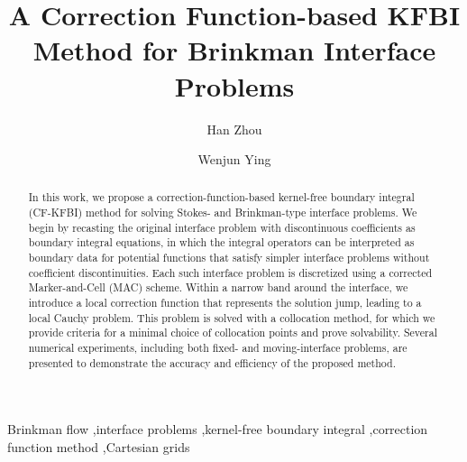 \documentclass[preprint,11pt]{elsarticle}
\theoremstyle{remark}
\begin{document}

\begin{frontmatter}

\title{A Correction Function-based KFBI Method for Brinkman Interface Problems}

\author[upenn]{Han Zhou}

\author[sjtu]{Wenjun Ying}


\address[upenn]{Department of Mathematics, University of Pennsylvania, Philadelphia, PA 19104, USA}
\address[sjtu]{School of Mathematical Sciences, MOE-LSC and Institute of Natural Sciences, Shanghai Jiao Tong University, Minhang, Shanghai 200240, China}

\begin{abstract}
In this work, we propose a correction-function-based kernel-free boundary integral (CF-KFBI) method for solving Stokes- and Brinkman-type interface problems. We begin by recasting the original interface problem with discontinuous coefficients as boundary integral equations, in which the integral operators can be interpreted as boundary data for potential functions that satisfy simpler interface problems without coefficient discontinuities. Each such interface problem is discretized using a corrected Marker-and-Cell (MAC) scheme. Within a narrow band around the interface, we introduce a local correction function that represents the solution jump, leading to a local Cauchy problem. This problem is solved with a collocation method, for which we provide criteria for a minimal choice of collocation points and prove solvability. Several numerical experiments, including both fixed- and moving-interface problems, are presented to demonstrate the accuracy and efficiency of the proposed method.
\end{abstract}

\begin{keyword}
Brinkman flow \sep interface problems \sep kernel-free boundary integral \sep correction function method \sep Cartesian grids
\end{keyword}

\end{frontmatter}
\end{document}
